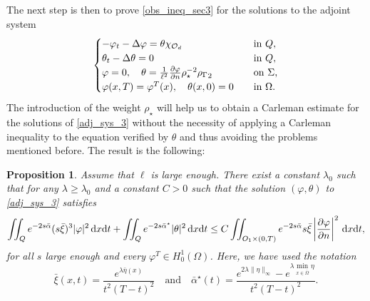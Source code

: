 \documentclass{aims}
\newtheorem{proposition}{Proposition}
\theoremstyle{definition}
\def\csbd{\rho_{\Gamma}}
\def\dx{\,\textnormal{d}x}
\def\dt{\textnormal{d}t}
\begin{document}
The next step is then to prove \eqref{obs_ineq_sec3} for the solutions to the adjoint system
%
\begin{equation}\label{adj_sys_3}
\begin{cases}
-\varphi_t-\Delta \varphi= \theta\chi_{\mathcal O_d} \quad&\textnormal{in }Q, \\
\theta_t-\Delta \theta=0 \quad& \textnormal{in }Q, \\
\varphi=0, \quad \theta=\frac{1}{\ell^2}\frac{\partial \varphi}{\partial n}\rho_{\star}^{-2}{\csbd}_2 \quad &\textnormal{on $\Sigma$,} \\
\varphi(x,T)=\varphi^T(x), \quad \theta(x,0)=0 \quad &\textnormal{in $\Omega$}.
\end{cases}
\end{equation}
%
The introduction of the weight $\rho_\star$ will help us to obtain a Carleman estimate for the solutions of \eqref{adj_sys_3} without the necessity of applying a Carleman inequality to the equation verified by $\theta$ and thus avoiding the problems mentioned before. The result is the following:
%
\begin{proposition}\label{prop_4_final}
%
Assume that $\ell$ is large enough. There exist a constant $\lambda_0$ such that for any $\lambda\geq \lambda_0$ and a constant $C>0$ such that the solution $(\varphi,\theta)$ to \eqref{adj_sys_3} satisfies 
%
\begin{equation}\label{car_final_sec3}
\iint_{Q}e^{-2s\bar\alpha}(s\bar\xi)^3|\varphi|^2\dx\dt+\iint_{Q}e^{-2s\bar\alpha^\star}|\theta|^2\dx\dt\leq C\iint_{\mathcal \mathcal O_1\times(0,T)}e^{-2s\bar\alpha}s\bar\xi\left|\frac{\partial \varphi}{\partial n}\right|^2\dx\dt,
\end{equation}
%
for all $s$ large enough and every $\varphi^T\in H_0^1(\Omega)$. Here, we have used the notation
%
\begin{equation*}
\bar\xi(x,t)=\frac{e^{\lambda\bar\eta(x)}}{t^2(T-t)^2} \quad\text{and}\quad \bar\alpha^\star(t)=\frac{e^{2\lambda\|\eta\|_\infty}-e^{\lambda\min_{x\in \overline\Omega}\eta}}{t^2(T-t)^2}.
\end{equation*}
%
\end{proposition}
%
\end{document}
